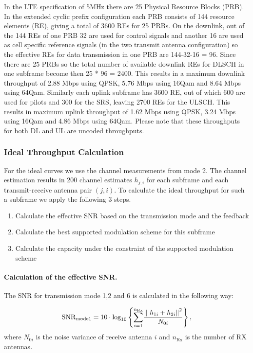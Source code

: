 \documentclass[a4paper,10pt]{article}
\begin{document}
In the LTE specification of 5MHz there are 25 Physical Resource Blocks (PRB). In the extended cyclic prefix configuration each PRB consists of 144 resource elements (RE), giving a total of 3600 REs for 25 PRBs. On the downlink, out of the 144 REs of one PRB 32 are used for control signals and another 16 are used as cell specific reference signals (in the two transmit antenna configuration) so the effective REs for data transmission in one PRB are 144-32-16 = 96. Since there are 25 PRBs so the total number of available downlink REs for DLSCH in one subframe become then 25 * 96 = 2400. This results in a maximum downlink throughput of 2.88 Mbps using QPSK, 5.76 Mbps using 16Qam and 8.64 Mbps using 64Qam. Similarly each uplink subframe has 3600 RE, out of which 600 are used for pilots and 300 for the SRS, leaving 2700 REs for the ULSCH. This results in maximum uplink throughput of 1.62 Mbps using QPSK, 3.24 Mbps using 16Qam and 4.86 Mbps using 64Qam. Please note that these throughputs for both DL and UL are uncoded throughputs. 

\subsubsection{Ideal Throughput Calculation}
For the ideal curves we use the channel measurements from mode 2. The channel estimation results in 200 channel estimates $h_{j,i}$ for each subframe and each transmit-receive antenna pair $(j,i)$. To calculate the ideal throughput for such a subframe we apply the following 3 steps.
\begin{enumerate}
 \item Calculate the effective SNR based on the transmission mode and the feedback
 \item Calculate the best supported modulation scheme for this subframe
 \item Calculate the capacity under the constraint of the supported modulation scheme
\end{enumerate}

\paragraph{Calculation of the effective SNR.}
The SNR for transmission mode 1,2 and 6 is calculated in the following way:

\begin{equation} \label{eq:snrsiso}
\mathrm{SNR}_{\mathrm{mode1}} = 10\cdot{\mathrm{log}}_{10} \left\lbrace {\sum_{i=1}^{n_{\mathrm{Rx}}}} {\frac{{\| \ {h_{1i}} + {h_{2i}} \| \\}^2}{N_{0i}}}\right\rbrace,
\end{equation}
where $N_{0i}$ is the noise variance of receive antenna $i$ and $n_{\mathrm{Rx}}$ is the number of RX antennas.
\end{document}

